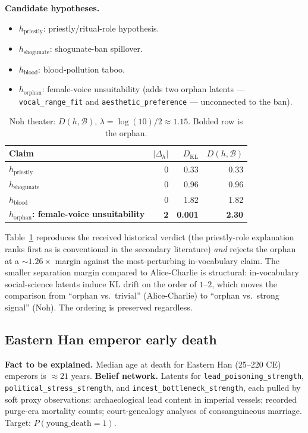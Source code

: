 \documentclass{article}
\begin{document}
\textbf{Candidate hypotheses.}

\begin{itemize}[leftmargin=*, itemsep=0pt]
\item $h_{\mathrm{priestly}}$: priestly/ritual-role hypothesis.
\item $h_{\mathrm{shogunate}}$: shogunate-ban spillover.
\item $h_{\mathrm{blood}}$: blood-pollution taboo.
\item $h_{\mathrm{orphan}}$: female-voice unsuitability (adds two
orphan latents --- \texttt{vocal\_range\_fit} and
\texttt{aesthetic\_preference} --- unconnected to the ban).
\end{itemize}

\begin{table}[t]
\centering
\caption{Noh theater: $D(h, \mathcal{B})$, $\lambda = \log(10)/2
\approx 1.15$. Bolded row is the orphan.}
\label{tab:noh}
\begin{tabular}{lrrr}
\toprule
Claim & $|\Delta_{h}|$ & $D_{\mathrm{KL}}$ & $D(h, \mathcal{B})$ \\
\midrule
$h_{\mathrm{priestly}}$    & 0 & 0.33 & 0.33 \\
$h_{\mathrm{shogunate}}$   & 0 & 0.96 & 0.96 \\
$h_{\mathrm{blood}}$       & 0 & 1.82 & 1.82 \\
\midrule
\textbf{$h_{\mathrm{orphan}}$: female-voice unsuitability} & \textbf{2} & \textbf{0.001} & \textbf{2.30} \\
\bottomrule
\end{tabular}
\end{table}

Table~\ref{tab:noh} reproduces the received historical verdict (the
priestly-role explanation ranks first as is conventional in the
secondary literature) \emph{and} rejects the orphan at a
$\sim 1.26\times$ margin against the most-perturbing in-vocabulary
claim. The smaller separation margin compared to
Alice-Charlie is structural: in-vocabulary social-science latents
induce KL drift on the order of $1$--$2$, which moves the comparison
from ``orphan vs.\ trivial'' (Alice-Charlie) to ``orphan vs.\ strong
signal'' (Noh). The ordering is preserved regardless.

\subsection{Eastern Han emperor early death}
\label{sec:han}

\textbf{Fact to be explained.} Median age at death for Eastern Han
(25--220 CE) emperors is $\approx 21$ years. \textbf{Belief network.}
Latents for \texttt{lead\_poisoning\_strength},
\texttt{political\_stress\_strength}, and
\texttt{incest\_bottleneck\_strength}, each pulled by soft proxy
observations: archaeological lead content in imperial vessels;
recorded purge-era mortality counts; court-genealogy analyses of
consanguineous marriage. Target: $P(\text{young\_death} = 1)$.
\end{document}
